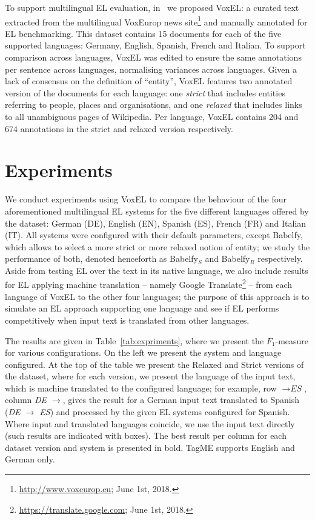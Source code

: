 \documentclass{llncs}
\begin{document}
To support multilingual EL evaluation, in~\cite{ourISWC} we proposed VoxEL: a curated text extracted from the multilingual VoxEurop news site\footnote{\url{http://www.voxeurop.eu}; June 1st, 2018.} and manually annotated for EL benchmarking. This dataset contains 15 documents for each of the five supported languages: Germany, English, Spanish, French and Italian. To support comparison across languages, VoxEL was edited to ensure the same annotations per sentence across languages, normalising variances across languages. Given a lack of consensus on the definition of ``entity'', VoxEL features two annotated version of the documents for each language: one \textit{strict} that includes entities referring to people, places and organisations, and one \textit{relaxed} that includes links to all unambiguous pages of Wikipedia. Per language, VoxEL contains 204 and 674 annotations in the strict and relaxed version respectively.

\section{Experiments}

We conduct experiments using VoxEL to compare the behaviour of the four aforementioned multilingual EL systems for the five different languages offered by the dataset: German (DE), English (EN), Spanish (ES), French (FR) and Italian (IT). All systems were configured with their default parameters, except Babelfy, which allows to select a more strict or more relaxed notion of entity; we study the performance of both, denoted henceforth as Babelfy$_S$ and Babelfy$_R$ respectively. Aside from testing EL over the text in its native language, we also include results for EL applying machine translation -- namely Google Translate\footnote{\url{https://translate.google.com}; June 1st, 2018.} -- from each language of VoxEL to the other four languages; the purpose of this approach is to simulate an EL approach supporting one language and see if EL performs competitively when input text is translated from other languages. 

The results are given in Table~\ref{tab:expriments}, where we present the $F_1$-measure for various configurations. On the left we present the system and language configured. At the top of the table we present the Relaxed and Strict versions of the dataset, where for each version, we present the language of the input text, which is machine translated to the configured language; for example, row $\rightarrow \textit{ES}$, column \textit{DE $\rightarrow$}, gives the result for a German input text translated to Spanish (\textit{DE $\rightarrow$ ES}) and processed by the given EL systems configured for Spanish. Where input and translated languages coincide, we use the input text directly (such results are indicated with boxes). The best result per column for each dataset version and system is presented in bold. TagME supports English and German only.
\end{document}
